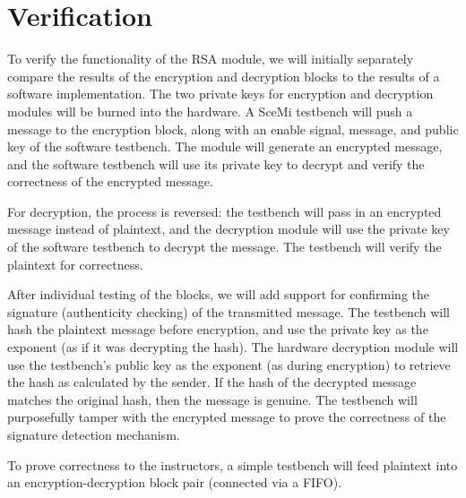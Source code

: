\documentclass[12pt]{article}
\begin{document}
\section{Verification}
To verify the functionality of the RSA module, we will initially separately 
compare the results of the encryption and decryption blocks to the results
of a software implementation. The two private keys for encryption and
decryption modules will be burned into the hardware. A SceMi testbench will
push a message to the encryption block, along with an enable signal, message,
and public key of the software testbench. The module will generate an encrypted message,
and the software testbench will use its private key to decrypt and verify the 
correctness of the encrypted message.

For decryption, the process is reversed: the testbench will pass in an 
encrypted message instead of plaintext, and the decryption module will use
the private key of the software testbench to decrypt the message. The testbench
will verify the plaintext for correctness.

After individual testing of the blocks, we will add support for confirming the signature
(authenticity checking) of the transmitted message. The testbench will hash the plaintext
message before encryption, and use the private key as the exponent (as if it was decrypting
the hash). The hardware decryption module will use the testbench's public key as the exponent
(as during encryption) to retrieve the hash as calculated by the sender. If the hash of the
decrypted message matches the original hash, then the message is genuine. The testbench
will purposefully tamper with the encrypted message to prove the correctness of the 
signature detection mechanism. 

To prove correctness to the instructors, a simple testbench will feed plaintext into an
encryption-decryption block pair (connected via a FIFO).
\end{document}
